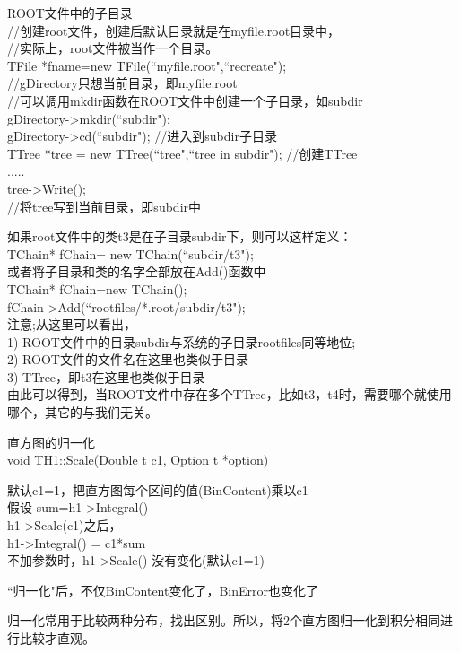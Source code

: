 \documentclass[12pt,a4paper]{article}
\begin{document}
ROOT文件中的子目录 \\
//创建root文件，创建后默认目录就是在myfile.root目录中，\\
//实际上，root文件被当作一个目录。\\
TFile *fname=new TFile(``myfile.root",``recreate"); \\
//gDirectory只想当前目录，即myfile.root \\
//可以调用mkdir函数在ROOT文件中创建一个子目录，如subdir \\
gDirectory->mkdir(``subdir"); \\
gDirectory->cd(``subdir"); //进入到subdir子目录 \\
TTree *tree = new TTree(``tree",``tree in subdir"); //创建TTree \\
..... \\
tree->Write(); \\//将tree写到当前目录，即subdir中

如果root文件中的类t3是在子目录subdir下，则可以这样定义：\\
TChain* fChain= new TChain(``subdir/t3"); \\
或者将子目录和类的名字全部放在Add()函数中 \\
TChain* fChain=new TChain(); \\
fChain->Add(``rootfiles/*.root/subdir/t3"); \\
注意;从这里可以看出，\\
1) ROOT文件中的目录subdir与系统的子目录rootfiles同等地位; \\
2) ROOT文件的文件名在这里也类似于目录 \\
3) TTree，即t3在这里也类似于目录 \\
由此可以得到，当ROOT文件中存在多个TTree，比如t3，t4时，需要哪个就使用哪个，其它的与我们无关。





直方图的归一化 \\
void TH1::Scale(Double$\_$t c1, Option$\_$t *option)

默认c1=1，把直方图每个区间的值(BinContent)乘以c1 \\
假设 sum=h1->Integral() \\
h1->Scale(c1)之后，\\
h1->Integral() = c1*sum \\
不加参数时，h1->Scale() 没有变化(默认c1=1)

``归一化"后，不仅BinContent变化了，BinError也变化了

归一化常用于比较两种分布，找出区别。所以，将2个直方图归一化到积分相同进行比较才直观。
\end{document}
